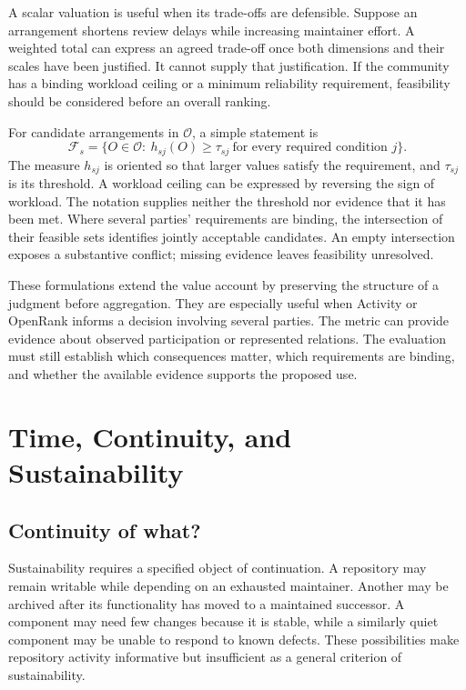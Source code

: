 A scalar valuation is useful when its trade-offs are defensible. Suppose an arrangement shortens review delays while increasing maintainer effort. A weighted total can express an agreed trade-off once both dimensions and their scales have been justified. It cannot supply that justification. If the community has a binding workload ceiling or a minimum reliability requirement, feasibility should be considered before an overall ranking.

For candidate arrangements in \(\mathcal O\), a simple statement is
\begin{equation}
\mathcal F_s=\{O\in\mathcal O:\ h_{sj}(O)\geq\tau_{sj}
\ \text{for every required condition }j\}.
\label{eq:feasible-value}
\end{equation}
The measure \(h_{sj}\) is oriented so that larger values satisfy the requirement, and \(\tau_{sj}\) is its threshold. A workload ceiling can be expressed by reversing the sign of workload. The notation supplies neither the threshold nor evidence that it has been met. Where several parties' requirements are binding, the intersection of their feasible sets identifies jointly acceptable candidates. An empty intersection exposes a substantive conflict; missing evidence leaves feasibility unresolved.

These formulations extend the value account by preserving the structure of a judgment before aggregation. They are especially useful when Activity or OpenRank informs a decision involving several parties. The metric can provide evidence about observed participation or represented relations. The evaluation must still establish which consequences matter, which requirements are binding, and whether the available evidence supports the proposed use.

\section{Time, Continuity, and Sustainability}
\label{sec:continuity}

\subsection{Continuity of what?}
Sustainability requires a specified object of continuation. A repository may remain writable while depending on an exhausted maintainer. Another may be archived after its functionality has moved to a maintained successor. A component may need few changes because it is stable, while a similarly quiet component may be unable to respond to known defects. These possibilities make repository activity informative but insufficient as a general criterion of sustainability.

